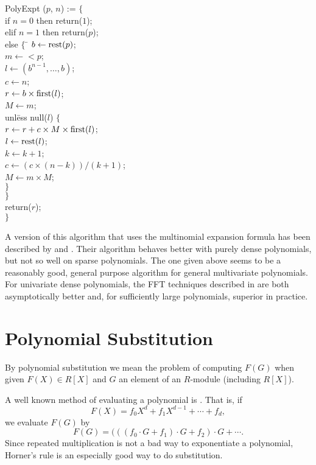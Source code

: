 \begindsacode
PolyExpt ($p$, $n$) := $\{$ \\
\> if $n=0$ then return($1$); \\
\> elif $n=1$ then return($p$); \\
\> else $\{$ \= $b \leftarrow \mbox{\rm rest}(p)$; \\
\> \> $m \leftarrow \lt p$; \\
\> \> $l \leftarrow (b^{n-1}, \ldots, b)$; \\
\> \> $c \leftarrow n$; \\
\> \> $r \leftarrow b \times \mbox{\rm first}(l)$; \\
\> \> $M \leftarrow m$; \\
\> \> unl\=ess null($l$) $\{$ \\
\> \> \> $r \leftarrow r + c \times M \times \mbox{\rm first}(l)$; \\
\> \> \> $l \leftarrow \mbox{\rm rest}(l)$; \\
\> \> \> $k \leftarrow k+1$; \\
\> \> \> $c \leftarrow (c \times (n - k))/(k+1)$; \\
\> \> \> $M \leftarrow m \times M$; \\
\> \> \> $\}$ \\
\> \> $\}$ \\
\> \> return($r$); \\
\> $\}$
\enddsacode

A version of this algorithm that uses the multinomial expansion
formula has been described by {\Alagar} and {\Probst}
\cite{Alagar1987-nq}.  Their algorithm behaves better with purely
dense polynomials, but not so well on sparse polynomials.  The one
given above seems to be a reasonably good, general purpose algorithm
for general multivariate polynomials.  For univariate dense
polynomials, the FFT techniques described in 
are both asymptotically better and, for sufficiently large
polynomials, superior in practice.

\section{Polynomial Substitution}
\label{Poly:Subs:Sec}

By polynomial substitution we mean the problem of computing $F(G)$
when given $F(X) \in R[X]$ and $G$ an element of an $R$-module
(including $R[X]$).

A well known method of evaluating a polynomial is .  That is, if
\[
F(X) = f_0 X^d + f_1 X^{d-1} + \cdots + f_d,
\]
we evaluate $F(G)$ by
\[
F(G) = (((f_0 \cdot G + f_1) \cdot G + f_2) \cdot G + \cdots.
\]
Since repeated multiplication is not a bad way to exponentiate a
polynomial, Horner's rule is an especially good way to do
substitution.  

